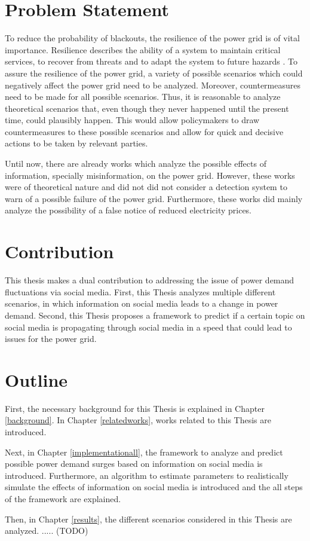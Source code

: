 \section{Problem Statement}
\label{problemstatement}

To reduce the probability of blackouts, 
the resilience of the power grid is of vital importance.
Resilience describes the ability of a system 
to maintain critical services, to recover from threats
and to adapt the system to future hazards 
\cite{wells2022modeling}.
To assure the resilience of the power grid, a variety of possible 
scenarios which could negatively affect the power grid need
to be analyzed. Moreover, countermeasures need to be made for all possible scenarios.
Thus, it is reasonable to analyze theoretical scenarios that, even though
they never happened until the present time, could plausibly happen. This 
would allow policymakers to draw countermeasures to these possible scenarios
and allow for quick and decisive actions to be taken by relevant 
parties.

Until now, there are already works which analyze the possible effects
of information, specially misinformation, on the power
grid. However, these works were of theoretical nature and did not 
did not consider a detection system to warn of a possible 
failure of the power grid. Furthermore, these works did mainly analyze the 
possibility of a false notice of reduced electricity prices.


\section{Contribution}
\label{contribution}
This thesis makes a dual contribution to addressing the issue of 
power demand fluctuations via social media.
First, this Thesis analyzes multiple different scenarios, in which
information on social media leads to a change in power demand.
Second, this Thesis proposes a framework to predict if 
a certain topic on social media is propagating through social media
in a speed that could lead to issues for the power grid.

\section{Outline}
\label{outline}

First, the necessary background for this Thesis is explained
in Chapter \ref{background}. 
In Chapter \ref{relatedworks}, works related to 
this Thesis are introduced.

Next, in Chapter \ref{implementationall}, the framework to
analyze and predict possible power demand surges based on
information on social media is introduced. Furthermore,
an algorithm to estimate parameters to realistically simulate
the effects of information on social media is introduced and 
the all steps of the framework are explained.

Then, in Chapter \ref{results}, the different scenarios considered in this
Thesis are analyzed. ..... (TODO)